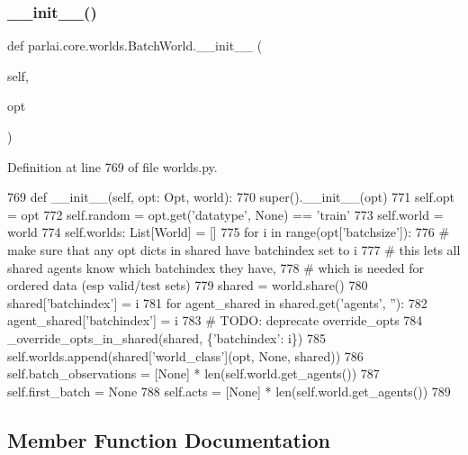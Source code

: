 \subsubsection{\texorpdfstring{\+\_\+\+\_\+init\+\_\+\+\_\+()}{\_\_init\_\_()}}
{\footnotesize\ttfamily def parlai.\+core.\+worlds.\+Batch\+World.\+\_\+\+\_\+init\+\_\+\+\_\+ (\begin{DoxyParamCaption}\item[{}]{self,  }\item[{}]{opt }\end{DoxyParamCaption})}



Definition at line 769 of file worlds.\+py.


\begin{DoxyCode}
769     \textcolor{keyword}{def }\_\_init\_\_(self, opt: Opt, world):
770         super().\_\_init\_\_(opt)
771         self.opt = opt
772         self.random = opt.get(\textcolor{stringliteral}{'datatype'}, \textcolor{keywordtype}{None}) == \textcolor{stringliteral}{'train'}
773         self.world = world
774         self.worlds: List[World] = []
775         \textcolor{keywordflow}{for} i \textcolor{keywordflow}{in} range(opt[\textcolor{stringliteral}{'batchsize'}]):
776             \textcolor{comment}{# make sure that any opt dicts in shared have batchindex set to i}
777             \textcolor{comment}{# this lets all shared agents know which batchindex they have,}
778             \textcolor{comment}{# which is needed for ordered data (esp valid/test sets)}
779             shared = world.share()
780             shared[\textcolor{stringliteral}{'batchindex'}] = i
781             \textcolor{keywordflow}{for} agent\_shared \textcolor{keywordflow}{in} shared.get(\textcolor{stringliteral}{'agents'}, \textcolor{stringliteral}{''}):
782                 agent\_shared[\textcolor{stringliteral}{'batchindex'}] = i
783             \textcolor{comment}{# TODO: deprecate override\_opts}
784             \_override\_opts\_in\_shared(shared, \{\textcolor{stringliteral}{'batchindex'}: i\})
785             self.worlds.append(shared[\textcolor{stringliteral}{'world\_class'}](opt, \textcolor{keywordtype}{None}, shared))
786         self.batch\_observations = [\textcolor{keywordtype}{None}] * len(self.world.get\_agents())
787         self.first\_batch = \textcolor{keywordtype}{None}
788         self.acts = [\textcolor{keywordtype}{None}] * len(self.world.get\_agents())
789 
\end{DoxyCode}


\subsection{Member Function Documentation}
\mbox{\label{classparlai_1_1core_1_1worlds_1_1BatchWorld_a0bf69fe51e7eb0f8ba2fc3748c8c9181}} 

